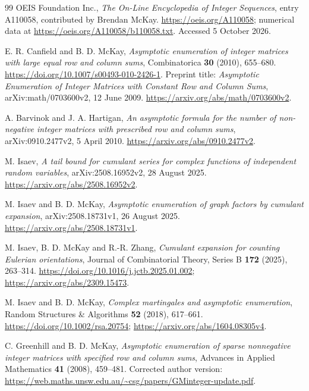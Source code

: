 \renewcommand{\refname}{References and source versions}
\begin{thebibliography}{99}
OEIS Foundation Inc., \emph{The On-Line Encyclopedia of Integer Sequences}, entry A110058, contributed by Brendan McKay.
\url{https://oeis.org/A110058}; numerical data at
\url{https://oeis.org/A110058/b110058.txt}. Accessed 5 October 2026.

E. R. Canfield and B. D. McKay,
\emph{Asymptotic enumeration of integer matrices with large equal row and column sums},
Combinatorica \textbf{30} (2010), 655--680.
\url{https://doi.org/10.1007/s00493-010-2426-1}.
Preprint title: \emph{Asymptotic Enumeration of Integer Matrices with Constant Row and Column Sums},
arXiv:math/0703600v2, 12 June 2009.
\url{https://arxiv.org/abs/math/0703600v2}.

A. Barvinok and J. A. Hartigan,
\emph{An asymptotic formula for the number of non-negative integer matrices with prescribed row and column sums},
arXiv:0910.2477v2, 5 April 2010.
\url{https://arxiv.org/abs/0910.2477v2}.

M. Isaev,
\emph{A tail bound for cumulant series for complex functions of independent random variables},
arXiv:2508.16952v2, 28 August 2025.
\url{https://arxiv.org/abs/2508.16952v2}.

M. Isaev and B. D. McKay,
\emph{Asymptotic enumeration of graph factors by cumulant expansion},
arXiv:2508.18731v1, 26 August 2025.
\url{https://arxiv.org/abs/2508.18731v1}.

M. Isaev, B. D. McKay and R.-R. Zhang,
\emph{Cumulant expansion for counting Eulerian orientations},
Journal of Combinatorial Theory, Series B \textbf{172} (2025), 263--314.
\url{https://doi.org/10.1016/j.jctb.2025.01.002};
\url{https://arxiv.org/abs/2309.15473}.

M. Isaev and B. D. McKay,
\emph{Complex martingales and asymptotic enumeration},
Random Structures \& Algorithms \textbf{52} (2018), 617--661.
\url{https://doi.org/10.1002/rsa.20754};
\url{https://arxiv.org/abs/1604.08305v4}.

C. Greenhill and B. D. McKay,
\emph{Asymptotic enumeration of sparse nonnegative integer matrices with specified row and column sums},
Advances in Applied Mathematics \textbf{41} (2008), 459--481.
Corrected author version:
\url{https://web.maths.unsw.edu.au/~csg/papers/GMinteger-update.pdf}.


\end{thebibliography}
